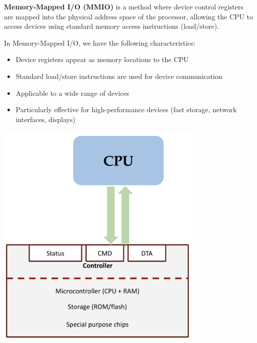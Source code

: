 \documentclass[../../compsys.tex]{subfiles}
\begin{document}
\begin{definition}
\textbf{Memory-Mapped I/O (MMIO)} is a method where device control registers are mapped into the physical address space of the processor, allowing the CPU to access devices using standard memory access instructions (load/store).
\end{definition}
\vspace{10px}
\begin{minipage}[htp]{0.45\textwidth}
    In Memory-Mapped I/O, we have the following characteristics:
    \begin{itemize}
        \item Device registers appear as memory locations to the CPU
        \item Standard load/store instructions are used for device communication
        \item Applicable to a wide range of devices
        \item Particularly effective for high-performance devices (fast storage, network interfaces, displays)
    \end{itemize}
\end{minipage}
\hfill
\vline
\hfill
\begin{minipage}[htp]{0.45\textwidth}
    \begin{center}
        \includegraphics[width=0.75\textwidth]{chapters/L8/images/mmio.png}
    \end{center}
\end{minipage}
\end{document}
